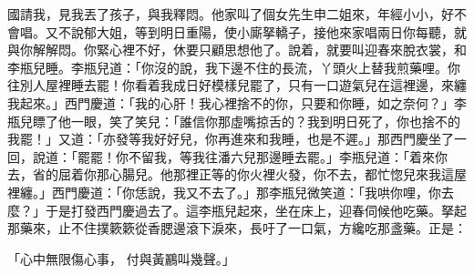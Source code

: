 \begin{showcontents}{}
國請我，見我丟了孩子，與我釋悶。他家叫了個女先生申二姐來，年經小小，好不會唱。又不說郁大姐，等到明日重陽，使小廝拏轎子，接他來家唱兩日你每聽，就與你解解悶。你緊心裡不好，休要只顧思想他了。說着，就要叫迎春來脫衣裳，和李瓶兒睡。李瓶兒道：「你沒的說，我下邊不住的長流，丫頭火上替我煎藥哩。你往別人屋裡睡去罷！你看着我成日好模樣兒罷了，只有一口遊氣兒在這裡邊，來纏我起來。」西門慶道：「我的心肝！我心裡捨不的你，只要和你睡，如之奈何？」李瓶兒瞟了他一眼，笑了笑兒：「誰信你那虛嘴掠舌的？我到明日死了，你也捨不的我罷！」又道：「亦發等我好好兒，你再進來和我睡，也是不遲。」那西門慶坐了一回，說道：「罷罷！你不留我，等我往潘六兒那邊睡去罷。」李瓶兒道：「着來你去，省的屈着你那心腸兒。他那裡正等的你火裡火發，你不去，都忙惚兒來我這屋裡纏。」西門慶道：「你恁說，我又不去了。」那李瓶兒微笑道：「我哄你哩，你去麼？」于是打發西門慶過去了。這李瓶兒起來，坐在床上，迎春伺候他吃藥。拏起那藥來，止不住撲簌簌從香腮邊滾下淚來，長吁了一口氣，方纔吃那盞藥。正是：

「心中無限傷心事，  付與黃鸝叫幾聲。」


\end{showcontents}
